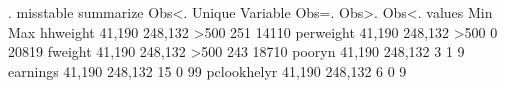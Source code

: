. misstable summarize
                                                               Obs<.
                                                {\TLC}
               {\VBAR}                                {\VBAR} Unique
      Variable {\VBAR}     Obs=.     Obs>.     Obs<.  {\VBAR} values        Min         Max
      hhweight {\VBAR}    41,190             248,132  {\VBAR}   >500        251       14110
     perweight {\VBAR}    41,190             248,132  {\VBAR}   >500          0       20819
       fweight {\VBAR}    41,190             248,132  {\VBAR}   >500        243       18710
        pooryn {\VBAR}    41,190             248,132  {\VBAR}      3          1           9
      earnings {\VBAR}    41,190             248,132  {\VBAR}     15          0          99
   pclookhelyr {\VBAR}    41,190             248,132  {\VBAR}      6          0           9
